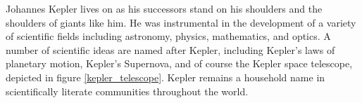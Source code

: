 \documentclass[11pt]{article}
\begin{document}
Johannes Kepler lives on as his
successors stand on his shoulders
and the shoulders of giants like him.
He was instrumental in the development of
a variety of scientific fields including
astronomy, physics, mathematics, and optics.
A number of scientific ideas are named after Kepler,
including Kepler's laws of planetary motion,
Kepler's Supernova,
and of course the Kepler space telescope,
depicted in figure \ref{kepler_telescope}.
Kepler remains  a household name in
scientifically literate communities
throughout the world.




\end{document}
